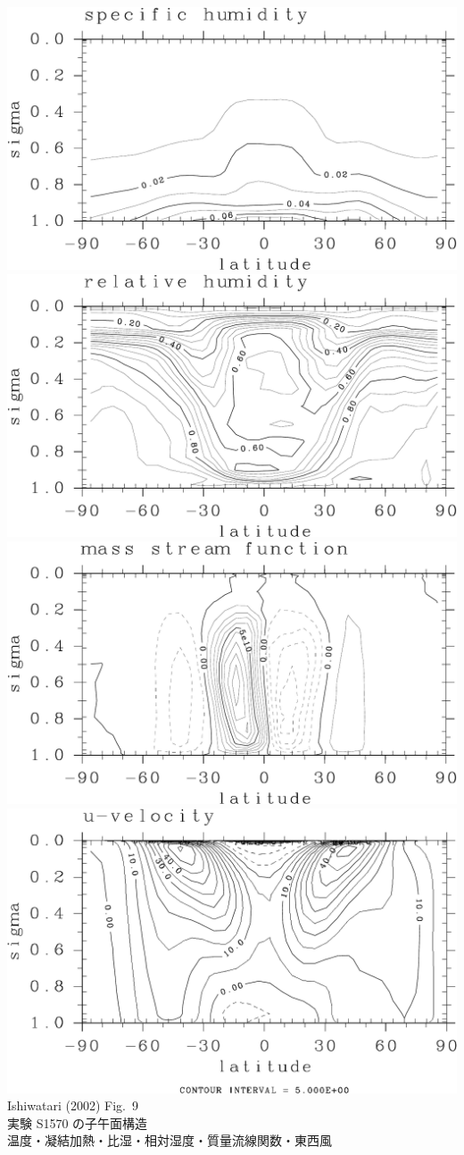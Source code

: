 \documentclass[aspectratio=149,9pt,fleqn]{beamer}
\begin{document}
\begin{frame}
\begin{columns}[T,onlytextwidth]
\begin{column}{.5\textwidth}
			\includegraphics[width=.45\textwidth]{./fig/157-q-meri.kps-crop.pdf}
			\includegraphics[width=.45\textwidth]{./fig/157-RH-meri.kps-crop.pdf}
			\includegraphics[width=.45\textwidth]{./fig/157-Strm-meri.kps-crop.pdf}
			\includegraphics[width=.45\textwidth]{./fig/157-u-meri-crop.pdf}\\
			\scriptsize Ishiwatari \etal (2002) Fig.\ 9\\
			実験 S1570 の子午面構造\\
			温度・凝結加熱・比湿・相対湿度・質量流線関数・東西風
		\end{column}
	\end{columns}
\end{frame}
\end{document}
